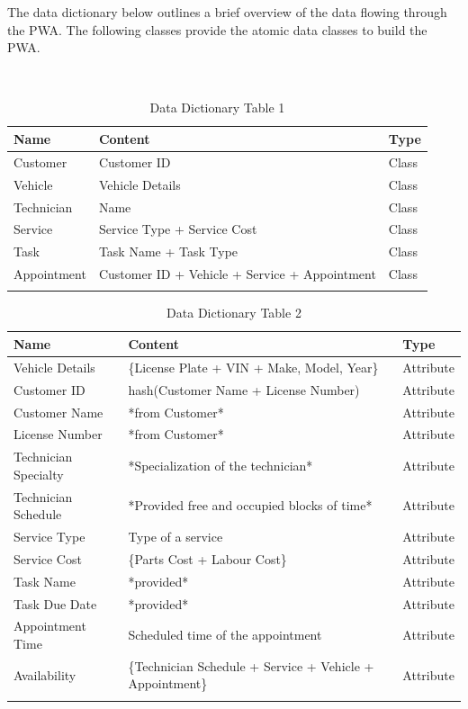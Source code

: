 \documentclass[12pt]{article}
\begin{document}
The data dictionary below outlines a brief overview of the data flowing through the PWA. The following classes provide the atomic data classes to build the PWA.

\\

\renewcommand{\arraystretch}{1.2}
\begin{longtable}{p{3cm}p{10cm}p{2cm}}
    \toprule
    \textbf{Name} & \textbf{Content}    & \textbf{Type} \\ 
    \midrule
    Customer      & Customer ID         & Class         \\
    Vehicle       & Vehicle Details & Class         \\
    Technician    & Name                & Class         \\
    Service       & Service Type + Service Cost         & Class         \\
    Task          & Task Name + Task Type         & Class         \\
    Appointment   & Customer ID + Vehicle + Service + Appointment &  Class \\
    \bottomrule
    \caption{Data Dictionary Table 1}
\end{longtable}


\renewcommand{\arraystretch}{1.2}
\begin{longtable}{p{4cm}p{10cm}p{2cm}}
    \toprule
    \textbf{Name} & \textbf{Content}    & \textbf{Type} \\ 
    \midrule
    Vehicle Details & \{License Plate + VIN  + Make, Model, Year\}    & Attribute         \\
    Customer ID     & hash(Customer Name + License Number)         & Attribute         \\
    Customer Name     & *from Customer*         & Attribute         \\
    License Number     &    *from Customer*      & Attribute         \\
    Technician Specialty  &      *Specialization of the technician*    & Attribute         \\
    Technician Schedule  &  *Provided free and occupied blocks of time*        & Attribute         \\
    Service Type     &  Type of a service     & Attribute         \\
    Service Cost     & \{Parts Cost + Labour Cost\}      & Attribute         \\
    Task Name         & *provided*     & Attribute         \\
    Task Due Date         & *provided*     & Attribute         \\
    Appointment Time  & Scheduled time of the appointment      & Attribute         \\
    Availability  & \{Technician Schedule + Service + Vehicle + Appointment\}    & Attribute\\
    \bottomrule
    \caption{Data Dictionary Table 2}
\end{longtable}
\end{document}
